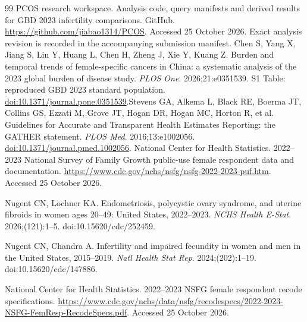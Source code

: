\documentclass[11pt,a4paper]{article}
\begin{document}
{\begin{thebibliography}{99}
 PCOS research workspace. Analysis code, query manifests and derived results for GBD 2023 infertility comparisons. GitHub. \url{https://github.com/jiabao1314/PCOS}. Accessed 25 October 2026. Exact analysis revision is recorded in the accompanying submission manifest.
Chen S, Yang X, Jiang S, Lin Y, Huang L, Chen H, Zheng J, Xie Y, Kuang Z. Burden and temporal trends of female-specific cancers in China: a systematic analysis of the 2023 global burden of disease study. \emph{PLOS One}. 2026;21:e0351539. S1 Table: reproduced GBD 2023 standard population. \href{https://doi.org/10.1371/journal.pone.0351539}{doi:10.1371/journal.pone.0351539}.Stevens GA, Alkema L, Black RE, Boerma JT, Collins GS, Ezzati M, Grove JT, Hogan DR, Hogan MC, Horton R, et al. Guidelines for Accurate and Transparent Health Estimates Reporting: the GATHER statement. \emph{PLOS Med}. 2016;13:e1002056. \href{https://doi.org/10.1371/journal.pmed.1002056}{doi:10.1371/journal.pmed.1002056}. National Center for Health Statistics. 2022--2023 National Survey of Family Growth public-use female respondent data and documentation. \url{https://www.cdc.gov/nchs/nsfg/nsfg-2022-2023-puf.htm}. Accessed 25 October 2026.

 Nugent CN, Lochner KA. Endometriosis, polycystic ovary syndrome, and uterine fibroids in women ages 20--49: United States, 2022--2023. \emph{NCHS Health E-Stat}. 2026;(121):1--5. doi:10.15620/cdc/252459.

 Nugent CN, Chandra A. Infertility and impaired fecundity in women and men in the United States, 2015--2019. \emph{Natl Health Stat Rep}. 2024;(202):1--19. doi:10.15620/cdc/147886.

 National Center for Health Statistics. 2022--2023 NSFG female respondent recode specifications. \url{https://www.cdc.gov/nchs/data/nsfg/recodespecs/2022-2023-NSFG-FemResp-RecodeSpecs.pdf}. Accessed 25 October 2026.
\end{thebibliography}
}
\end{document}
